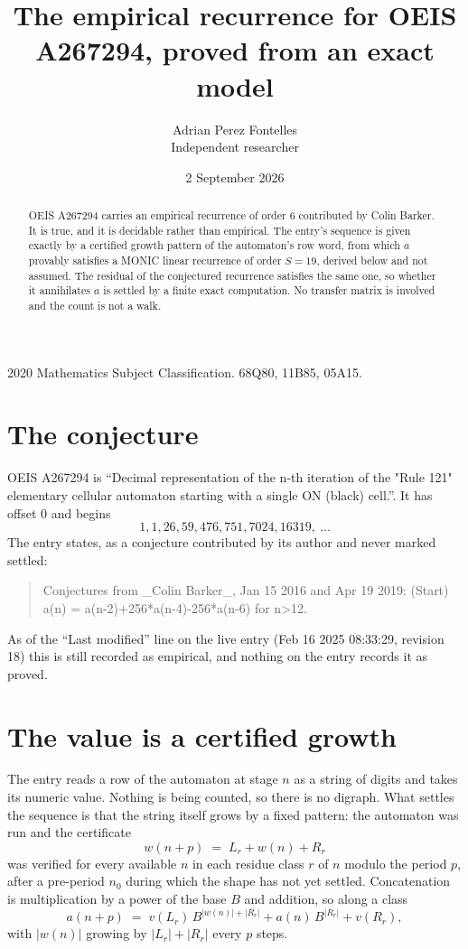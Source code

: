 \documentclass[11pt,a4paper]{article}
\title{The empirical recurrence for OEIS A267294, proved from an exact model}
\author{Adrian Perez Fontelles\\ \small Independent researcher}
\date{2 September 2026}
\theoremstyle{plain}
\theoremstyle{definition}
\begin{document}
\maketitle

\begin{abstract}
OEIS A267294 carries an empirical recurrence of order $6$ contributed by Colin Barker. It is true, and it is
decidable rather than empirical. The entry's sequence is given exactly by a certified growth pattern of the automaton's row word, from
which $a$ provably satisfies a MONIC linear recurrence of order $S=19$, derived below and not
assumed. The residual of the conjectured recurrence satisfies the same one, so whether it
annihilates $a$ is settled by a finite exact computation. No transfer matrix is involved and
the count is not a walk.
\end{abstract}

\noindent\small 2020 Mathematics Subject Classification. 68Q80, 11B85, 05A15.\normalsize

\section{The conjecture}

OEIS A267294 is ``Decimal representation of the n-th iteration of the "Rule 121" elementary cellular automaton starting with a single ON (black) cell.''. It has offset $0$ and begins
\[
1, 1, 26, 59, 476, 751, 7024, 16319,\ \dots
\]
The entry states, as a conjecture contributed by its author and never marked settled:
\begin{quote}
Conjectures from \_Colin Barker\_, Jan 15 2016 and Apr 19 2019: (Start) a(n) = a(n-2)+256*a(n-4)-256*a(n-6) for n>12.
\end{quote}
As of the ``Last modified'' line on the live entry (Feb 16 2025 08:33:29, revision 18)
this is still recorded as empirical, and nothing on the entry records it as proved.

\section{The value is a certified growth}

The entry reads a row of the automaton at stage $n$ as a string of digits and takes its
numeric value. Nothing is being counted, so there is no digraph. What settles the sequence is
that the string itself grows by a fixed pattern: the automaton was run and the certificate
\[
w(n+p)\;=\;L_r + w(n) + R_r
\]
was verified for every available $n$ in each residue class $r$ of $n$ modulo the period $p$,
after a pre-period $n_0$ during which the shape has not yet settled. Concatenation is
multiplication by a power of the base $B$ and addition, so along a class
\[
a(n+p)\;=\;v(L_r)\,B^{|w(n)|+|R_r|} + a(n)\,B^{|R_r|} + v(R_r),
\]
with $|w(n)|$ growing by $|L_r|+|R_r|$ every $p$ steps.
\end{document}

